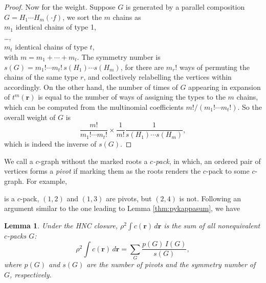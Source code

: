 \documentclass[notitlepage,preprint]{revtex4-1}
\newtheorem{lemm}[thrm]{Lemma}
\newcommand{\vct}[1]{\mathbf{#1}}
\providecommand{\vr}{} %
\renewcommand{\vr}{\vct{r}}
\begin{document}
\begin{proof}
Now for the weight.
%
Suppose $G$ is generated by
  a parallel composition $G = H_1 \cdots H_m (\cdot f)$,
%
we sort the $m$ chains as \\
  \hphantom{~~~~}
    $m_1$ identical chains of type 1, \\
  \hphantom{~~~~}
    \dots, \\
  \hphantom{~~~~}
    $m_t$ identical chains of type $t$, \\
  with
    $m = m_1 + \cdots + m_t$.
%
The symmetry number is
  $s(G) = m_1! \cdots m_t! \, s(H_1) \cdots s(H_m)$,
  for there are $m_r!$ ways of
  permuting the chains of the same type $r$,
  and collectively relabelling the vertices within accordingly.
%
On the other hand,
  the number of times of $G$
  appearing in expansion of $t^m(\vr)$
  is equal to the number of ways
  of assigning the types to the $m$ chains,
  which can be computed from the multinomial coefficients
  $m!/(m_1! \cdots m_t!)$.
%
So the overall weight of $G$ is
%
\[
  \frac{ m! } { m_1! \cdots m_t! }
  \times
  \frac{ 1 } { m! }
  \frac{ 1 } { s(H_1) \cdots s(H_m) },
\]
%
which is indeed the inverse of $s(G)$.
\end{proof}





We call a $c$-graph without the marked roots a \emph{$c$-pack},
%
in which,
  an ordered pair of vertices forms a \emph{pivot}
  if marking them as the roots renders the $c$-pack to some $c$-graph.
%
For example,
is a $c$-pack,
  $(1, 2)$ and $(1, 3)$ are pivots,
  but $(2, 4)$ is not.
%
Following an argument similar to the one leading to Lemma \ref{thm:pykappasum},
  we have

\begin{lemm}
Under the HNC closure,
%
$\rho^2 \int c(\vr) \, d\vr$
  is the sum of all nonequivalent $c$-packs $G$:
%
\begin{equation}
    \rho^2 \int c(\vr) \, d\vr
  = \sum_G \frac{ p(G) \, I(G) }{ s(G) },
  \label{eq:hnccrsum}
\end{equation}
%
where $p(G)$ and $s(G)$ are
  the number of pivots and
  the symmetry number
  of $G$,
  respectively.
\label{thm:hnccrsum}
\end{lemm}
\end{document}
